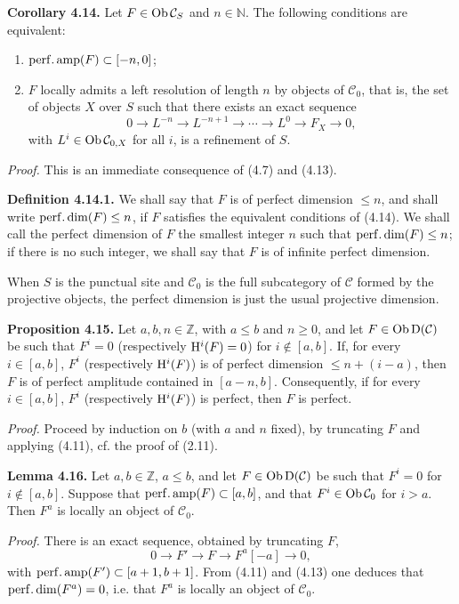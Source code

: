 \documentclass[11pt]{article}
\begin{document}
\textbf{Corollary 4.14.} Let \(F\in\operatorname{Ob}\mathcal C_S\) and \(n\in\mathbb N\). The following conditions are equivalent:
\begin{enumerate}[label=(\roman*)]
\item \(\operatorname{perf.amp}(F)\subset[-n,0]\);
\item \(F\) locally admits a left resolution of length \(n\) by objects of \(\mathcal C_0\), that is, the set of objects \(X\) over \(S\) such that there exists an exact sequence
\[
  0\longrightarrow L^{-n}\longrightarrow L^{-n+1}\longrightarrow \cdots
  \longrightarrow L^0\longrightarrow F_X\longrightarrow 0,
\]
with \(L^i\in\operatorname{Ob}\mathcal C_{0,X}\) for all \(i\), is a refinement of \(S\).
\end{enumerate}

\emph{Proof.} This is an immediate consequence of (4.7) and (4.13).

\textbf{Definition 4.14.1.} We shall say that \(F\) is of perfect dimension \(\leq n\), and shall write \(\operatorname{perf.dim}(F)\leq n\), if \(F\) satisfies the equivalent conditions of (4.14). We shall call the perfect dimension of \(F\) the smallest integer \(n\) such that \(\operatorname{perf.dim}(F)\leq n\); if there is no such integer, we shall say that \(F\) is of infinite perfect dimension.

When \(S\) is the punctual site and \(\mathcal C_0\) is the full subcategory of \(\mathcal C\) formed by the projective objects, the perfect dimension is just the usual projective dimension.

\textbf{Proposition 4.15.} Let \(a,b,n\in\mathbb Z\), with \(a\leq b\) and \(n\geq0\), and let \(F\in\operatorname{Ob}\mathrm D(\mathcal C)\) be such that \(F^i=0\) (respectively \(\mathrm H^i(F)=0\)) for \(i\notin[a,b]\). If, for every \(i\in[a,b]\), \(F^i\) (respectively \(\mathrm H^i(F)\)) is of perfect dimension \(\leq n+(i-a)\), then \(F\) is of perfect amplitude contained in \([a-n,b]\). Consequently, if for every \(i\in[a,b]\), \(F^i\) (respectively \(\mathrm H^i(F)\)) is perfect, then \(F\) is perfect.

\emph{Proof.} Proceed by induction on \(b\) (with \(a\) and \(n\) fixed), by truncating \(F\) and applying (4.11), cf. the proof of (2.11).

\textbf{Lemma 4.16.} Let \(a,b\in\mathbb Z\), \(a\leq b\), and let \(F\in\operatorname{Ob}\mathrm D(\mathcal C)\) be such that \(F^i=0\) for \(i\notin[a,b]\). Suppose that \(\operatorname{perf.amp}(F)\subset[a,b]\), and that \(F^i\in\operatorname{Ob}\mathcal C_0\) for \(i>a\). Then \(F^a\) is locally an object of \(\mathcal C_0\).

\emph{Proof.} There is an exact sequence, obtained by truncating \(F\),
\[
  0\longrightarrow F'\longrightarrow F\longrightarrow F^a[-a]\longrightarrow 0,
\]
with \(\operatorname{perf.amp}(F')\subset[a+1,b+1]\). From (4.11) and (4.13) one deduces that \(\operatorname{perf.dim}(F^a)=0\), i.e. that \(F^a\) is locally an object of \(\mathcal C_0\).
\end{document}

